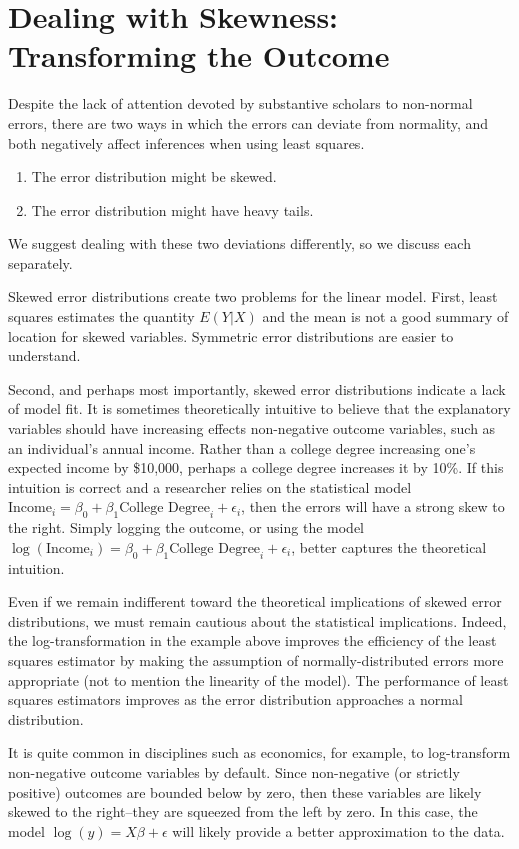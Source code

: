 \documentclass[12pt]{article}
\begin{document}
\section*{Dealing with Skewness: Transforming the Outcome}

Despite the lack of attention devoted by substantive scholars to non-normal errors, there are two ways in which the errors can deviate from normality, and both negatively affect inferences when using least squares. 
\begin{enumerate}
\item The error distribution might be skewed. 
\item The error distribution might have heavy tails. 
\end{enumerate}

We suggest dealing with these two deviations differently, so we discuss each separately.

Skewed error distributions create two problems for the linear model. 
First, least squares estimates the quantity $E(Y | X)$ and the mean is not a good summary of location for skewed variables. 
Symmetric error distributions are easier to understand. 

Second, and perhaps most importantly, skewed error distributions indicate a lack of model fit. 
It is sometimes theoretically intuitive to believe that the explanatory variables should have increasing effects non-negative outcome variables, such as an individual's annual income. 
Rather than a college degree increasing one's expected income by \$10,000, perhaps a college degree increases it by 10\%. 
If this intuition is correct and a researcher relies on the statistical model $\text{Income}_i = \beta_0 + \beta_1 \text{College Degree}_i + \epsilon_i$, then the errors will have a strong skew to the right. Simply logging the outcome, or using the model $\log (\text{Income}_i) = \beta_0 + \beta_1 \text{College Degree}_i + \epsilon_i$, better captures the theoretical intuition.

Even if we remain indifferent toward the theoretical implications of skewed error distributions, we must remain cautious about the statistical implications. 
Indeed, the log-transformation in the example above improves the efficiency of the least squares estimator by making the assumption of normally-distributed errors more appropriate (not to mention the linearity of the model).
The performance of least squares estimators improves as the error distribution approaches a normal distribution. 

It is quite common in disciplines such as economics, for example, to log-transform non-negative outcome variables by default. 
Since non-negative (or strictly positive) outcomes are bounded below by zero, then these variables are likely skewed to the right--they are squeezed from the left by zero. 
In this case, the model $\log(y) = X\beta + \epsilon$ will likely provide a better approximation to the data.
\end{document}
